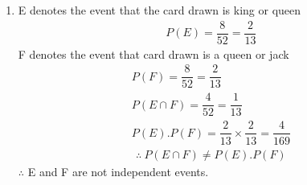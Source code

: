 \documentclass[12pt, journal]{IEEEtran}
\begin{document}
\begin{enumerate}[label=(\roman*)]
		\item
			E denotes the event that the card drawn is king or queen
			\begin{align}
				P(E) = \dfrac{8}{52} = \dfrac{2}{13}
			\end{align}
			F denotes the event that card drawn is a queen or jack 
			\begin{align}
				P(F) = \dfrac{8}{52} = \dfrac{2}{13} \\
				P(E \cap F) = \dfrac{4}{52} = \dfrac{1}{13}\\
				P(E).P(F) = \dfrac{2}{13} \times \dfrac{2}{13} = \dfrac{4}{169}
			\end{align}
			\begin{align}
				\therefore~P(E \cap F) \neq P(E).P(F)
			\end{align}
			$\therefore$  E and F are not independent events. \\
		
	\end{enumerate}
\end{document}

